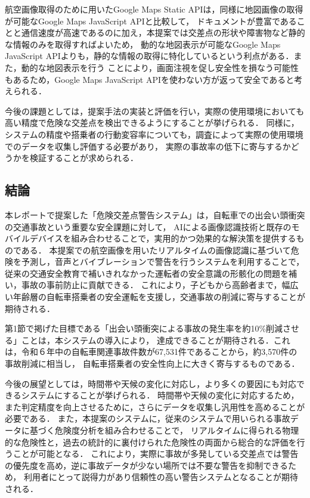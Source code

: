 \documentclass[uplatex,dvipdfmx]{jsarticle}
\begin{document}
航空画像取得のために用いたGoogle Maps Static APIは，同様に地図画像の取得が可能なGoogle Maps JavaScript APIと比較して，
ドキュメントが豊富であることと通信速度が高速であるのに加え，本提案では交差点の形状や障害物など静的な情報のみを取得すればよいため，
動的な地図表示が可能なGoogle Maps JavaScript APIよりも，静的な情報の取得に特化しているという利点がある．また，動的な地図表示を行う
ことにより，画面注視を促し安全性を損なう可能性もあるため，Google Maps JavaScript APIを使わない方が返って安全であると考えられる．

今後の課題としては，提案手法の実装と評価を行い，実際の使用環境においても高い精度で危険な交差点を検出できるようにすることが挙げられる．
同様に，システムの精度や搭乗者の行動変容率についても，調査によって実際の使用環境でのデータを収集し評価する必要があり，
実際の事故率の低下に寄与するかどうかを検証することが求められる．

\subsection{結論}
本レポートで提案した「危険交差点警告システム」は，自転車での出会い頭衝突の交通事故という重要な安全課題に対して，
AIによる画像認識技術と既存のモバイルデバイスを組み合わせることで，実用的かつ効果的な解決策を提供するものである．
本提案での航空画像を用いたリアルタイムの画像認識に基づいて危険を予測し，音声とバイブレーションで警告を行うシステムを利用することで，
従来の交通安全教育で補いきれなかった運転者の安全意識の形骸化の問題を補い，事故の事前防止に貢献できる．
これにより，子どもから高齢者まで，幅広い年齢層の自転車搭乗者の安全運転を支援し，交通事故の削減に寄与することが期待される．

第1節で掲げた目標である「出会い頭衝突による事故の発生率を約10\%削減させる」ことは，本システムの導入により，
達成できることが期待される．これは，令和６年中の自転車関連事故件数が67,531件であることから，約3,570件の事故削減に相当し，
自転車搭乗者の安全性向上に大きく寄与するものである．

今後の展望としては，時間帯や天候の変化に対応し，より多くの要因にも対応できるシステムにすることが挙げられる．
時間帯や天候の変化に対応するため，また判定精度を向上させるために，さらにデータを収集し汎用性を高めることが必要である．
また，本提案のシステムに，従来のシステムで用いられる事故データに基づく危険度分析を組み合わせることで，
リアルタイムに得られる物理的な危険性と，過去の統計的に裏付けられた危険性の両面から総合的な評価を行うことが可能となる．
これにより，実際に事故が多発している交差点では警告の優先度を高め，逆に事故データが少ない場所では不要な警告を抑制できるため，
利用者にとって説得力があり信頼性の高い警告システムとなることが期待される．
\end{document}
